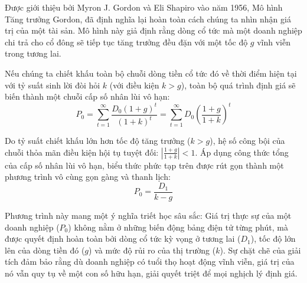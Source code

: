 \documentclass[14pt, a4paper, oneside]{extreport}
\begin{document}
Được giới thiệu bởi Myron J. Gordon và Eli Shapiro vào năm 1956, Mô hình Tăng trưởng Gordon, đã định nghĩa lại hoàn toàn cách chúng ta nhìn nhận giá trị của một tài sản. Mô hình này giả định rằng dòng cổ tức mà một doanh nghiệp chi trả cho cổ đông sẽ tiếp tục tăng trưởng đều đặn với một tốc độ $g$ vĩnh viễn trong tương lai.

Nếu chúng ta chiết khấu toàn bộ chuỗi dòng tiền cổ tức đó về thời điểm hiện tại với tỷ suất sinh lời đòi hỏi $k$ (với điều kiện $k > g$), toàn bộ quá trình định giá sẽ biến thành một chuỗi cấp số nhân lùi vô hạn:
\begin{equation}
    P_0 = \sum_{t=1}^{\infty} \frac{D_0(1+g)^t}{(1+k)^t} = \sum_{t=1}^{\infty} D_0 \left( \frac{1+g}{1+k} \right)^t
\end{equation}

Do tỷ suất chiết khấu lớn hơn tốc độ tăng trưởng ($k > g$), hệ số công bội của chuỗi thỏa mãn điều kiện hội tụ tuyệt đối: $\left| \frac{1+g}{1+k} \right| < 1$. Áp dụng công thức tổng của cấp số nhân lùi vô hạn, biểu thức phức tạp trên được rút gọn thành một phương trình vô cùng gọn gàng và thanh lịch:
\begin{equation}
    P_0 = \frac{D_1}{k - g}
\end{equation}

Phương trình này mang một ý nghĩa triết học sâu sắc: Giá trị thực sự của một doanh nghiệp ($P_0$) không nằm ở những biến động bảng điện tử từng phút, mà được quyết định hoàn toàn bởi dòng cổ tức kỳ vọng ở tương lai ($D_1$), tốc độ lớn lên của dòng tiền đó ($g$) và mức độ rủi ro của thị trường ($k$). Sự chặt chẽ của giải tích đảm bảo rằng dù doanh nghiệp có tuổi thọ hoạt động vĩnh viễn, giá trị của nó vẫn quy tụ về một con số hữu hạn, giải quyết triệt để mọi nghịch lý định giá.
\end{document}
